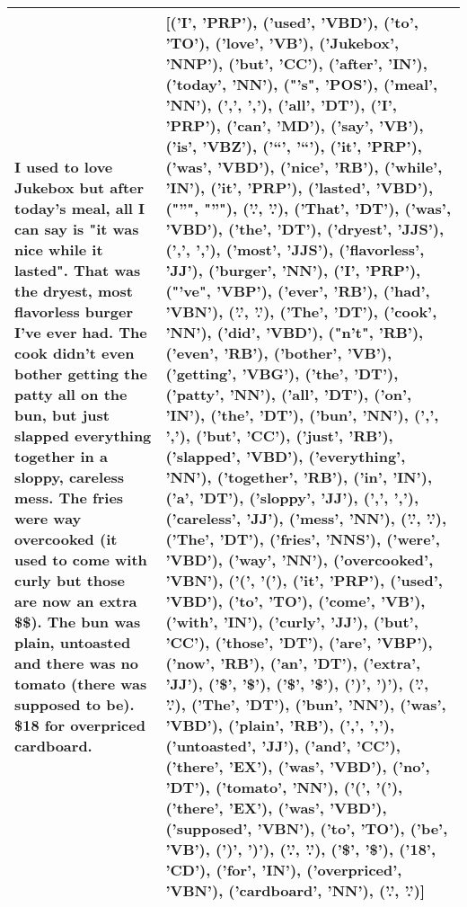 \begin{longtable}{|| p{3cm} | p{3cm} ||}
         \hline
         I used to love Jukebox but after today's meal, all I can say is "it was nice while it lasted". That was the dryest, most flavorless burger I've ever had. The cook didn't even bother getting the patty all on the bun, but just slapped everything together in a sloppy, careless mess. The fries were way overcooked (it used to come with curly but those are now an extra \$\$). The bun was plain, untoasted and there was no tomato (there was supposed to be). \$18 for overpriced cardboard. & [('I', 'PRP'), ('used', 'VBD'), ('to', 'TO'), ('love', 'VB'), ('Jukebox', 'NNP'), ('but', 'CC'), ('after', 'IN'), ('today', 'NN'), ("'s", 'POS'), ('meal', 'NN'), (',', ','), ('all', 'DT'), ('I', 'PRP'), ('can', 'MD'), ('say', 'VB'), ('is', 'VBZ'), ('``', '``'), ('it', 'PRP'), ('was', 'VBD'), ('nice', 'RB'), ('while', 'IN'), ('it', 'PRP'), ('lasted', 'VBD'), ("''", "''"), ('.', '.'), ('That', 'DT'), ('was', 'VBD'), ('the', 'DT'), ('dryest', 'JJS'), (',', ','), ('most', 'JJS'), ('flavorless', 'JJ'), ('burger', 'NN'), ('I', 'PRP'), ("'ve", 'VBP'), ('ever', 'RB'), ('had', 'VBN'), ('.', '.'), ('The', 'DT'), ('cook', 'NN'), ('did', 'VBD'), ("n't", 'RB'), ('even', 'RB'), ('bother', 'VB'), ('getting', 'VBG'), ('the', 'DT'), ('patty', 'NN'), ('all', 'DT'), ('on', 'IN'), ('the', 'DT'), ('bun', 'NN'), (',', ','), ('but', 'CC'), ('just', 'RB'), ('slapped', 'VBD'), ('everything', 'NN'), ('together', 'RB'), ('in', 'IN'), ('a', 'DT'), ('sloppy', 'JJ'), (',', ','), ('careless', 'JJ'), ('mess', 'NN'), ('.', '.'), ('The', 'DT'), ('fries', 'NNS'), ('were', 'VBD'), ('way', 'NN'), ('overcooked', 'VBN'), ('(', '('), ('it', 'PRP'), ('used', 'VBD'), ('to', 'TO'), ('come', 'VB'), ('with', 'IN'), ('curly', 'JJ'), ('but', 'CC'), ('those', 'DT'), ('are', 'VBP'), ('now', 'RB'), ('an', 'DT'), ('extra', 'JJ'), ('\$', '\$'), ('\$', '\$'), (')', ')'), ('.', '.'), ('The', 'DT'), ('bun', 'NN'), ('was', 'VBD'), ('plain', 'RB'), (',', ','), ('untoasted', 'JJ'), ('and', 'CC'), ('there', 'EX'), ('was', 'VBD'), ('no', 'DT'), ('tomato', 'NN'), ('(', '('), ('there', 'EX'), ('was', 'VBD'), ('supposed', 'VBN'), ('to', 'TO'), ('be', 'VB'), (')', ')'), ('.', '.'), ('\$', '\$'), ('18', 'CD'), ('for', 'IN'), ('overpriced', 'VBN'), ('cardboard', 'NN'), ('.', '.')] \\
         \hline

\end{longtable}
